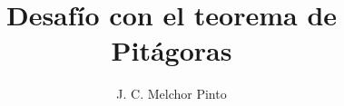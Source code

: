 \documentclass[12pt]{guia}
\title{Desafío con el teorema de Pitágoras}
\author{J. C. Melchor Pinto}
\begin{document}
\pagestyle{headandfoot}
\addpoints
\INFO
\printanswers

\newpage
\begin{questions}
    \questionboxed[10] 
    \questionboxed[10] 
    \questionboxed[10] 
    \questionboxed[10] 
    \questionboxed[10] 
    \questionboxed[10] 
    \questionboxed[10] 
    \questionboxed[10] 
    \questionboxed[10] 
\end{questions}
\end{document}
